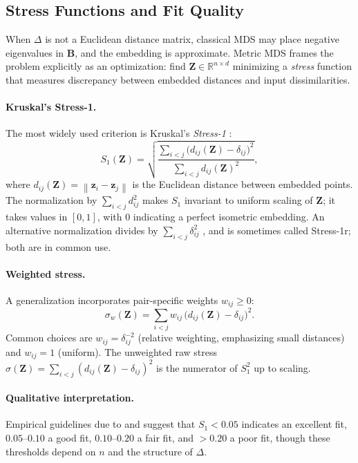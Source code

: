 \documentclass[twoside,11pt]{article}
\newcommand{\R}{\mathbb{R}}
\newcommand{\bz}{\mathbf{z}}
\newcommand{\bZ}{\mathbf{Z}}
\newcommand{\bB}{\mathbf{B}}
\newcommand{\norm}[1]{\left\|#1\right\|}
\newcommand{\StressOne}{S_1}
\begin{document}
\subsection{Stress Functions and Fit Quality}
\label{sec:metric_mds}

When $\Delta$ is not a Euclidean distance matrix, classical MDS may place
negative eigenvalues in $\bB$, and the embedding is approximate.  Metric
MDS \citep{kruskal1964multidimensional} frames the problem explicitly as
an optimization: find $\bZ \in \R^{n \times d}$ minimizing a \emph{stress}
function that measures discrepancy between embedded distances and input
dissimilarities.

\paragraph{Kruskal's Stress-1.}
The most widely used criterion is Kruskal's \emph{Stress-1}
\citep{kruskal1964multidimensional}:
\begin{equation}
  \StressOne(\bZ) = \sqrt{
    \frac{\displaystyle\sum_{i < j}
          \bigl(d_{ij}(\bZ) - \delta_{ij}\bigr)^2}
         {\displaystyle\sum_{i < j} d_{ij}(\bZ)^2}
  },
  \label{eq:stress1}
\end{equation}
where $d_{ij}(\bZ) = \norm{\bz_i - \bz_j}$ is the Euclidean distance
between embedded points.  The normalization by $\sum_{i<j} d_{ij}^2$
makes $\StressOne$ invariant to uniform scaling of $\bZ$; it takes values
in $[0, 1]$, with 0 indicating a perfect isometric embedding.  An
alternative normalization divides by $\sum_{i<j} \delta_{ij}^2$
\citep{borg2005modern}, and is sometimes called Stress-1r; both are in
common use.

\paragraph{Weighted stress.}
A generalization incorporates pair-specific weights $w_{ij} \geq 0$:
\begin{equation}
  \sigma_w(\bZ)
  = \sum_{i < j} w_{ij}\,\bigl(d_{ij}(\bZ) - \delta_{ij}\bigr)^2.
  \label{eq:weighted_stress}
\end{equation}
Common choices are $w_{ij} = \delta_{ij}^{-2}$ (relative weighting,
emphasizing small distances) and $w_{ij} = 1$ (uniform).  The unweighted
raw stress $\sigma(\bZ) = \sum_{i<j}(d_{ij}(\bZ) - \delta_{ij})^2$
is the numerator of $\StressOne^2$ up to scaling.

\paragraph{Qualitative interpretation.}
Empirical guidelines due to \citet{kruskal1964nonmetric} and
\citet{borg2005modern} suggest that $\StressOne < 0.05$ indicates an
excellent fit, $0.05$--$0.10$ a good fit, $0.10$--$0.20$ a fair fit, and
$> 0.20$ a poor fit, though these thresholds depend on $n$ and the
structure of $\Delta$.
\end{document}
